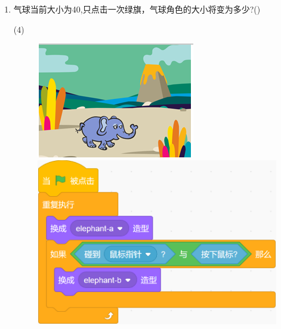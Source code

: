 \documentclass[10pt, a4paper]{article}
\begin{document}
\begin{enumerate}
        \item 气球当前大小为40,只点击一次绿旗，气球角色的大小将变为多少?(\qquad)
        \begin{tasks}(4)
        \end{tasks}

        \begin{figure}[htbp]
            \centering
            \begin{minipage}[t]{.36\textwidth}
                \centering
                \begin{minipage}[t]{.4\textwidth}
                    \centering
                    \includegraphics[width=\textwidth]{19-1.png}
                \end{minipage}
                \begin{minipage}[t]{.58\textwidth}
                    \centering
                    \includegraphics[width=\textwidth]{19-2.png}

\end{minipage}
\end{minipage}
\end{figure}
\end{enumerate}
\end{document}
